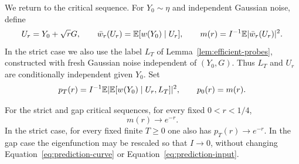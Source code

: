 We return to the critical sequence.  For $Y_0\sim\eta$ and independent
Gaussian noise, define
\[
 U_r=Y_0+\sqrt rG,\qquad
 \bar w_r(U_r)=\mathbb E[w(Y_0)\mid U_r],\qquad
 m(r)=I^{-1}\mathbb E|\bar w_r(U_r)|^2.
\]
In the strict case we also use the label $L_T$ of
Lemma~\ref{lem:efficient-probes}, constructed with fresh Gaussian noise
independent of $(Y_0,G)$. Thus $L_T$ and $U_r$ are conditionally
independent given $Y_0$. Set
\[
 p_T(r)=I^{-1}\mathbb E|\mathbb E[w(Y_0)\mid U_r,L_T]|^2,
 \qquad p_0(r)=m(r).
\]

\begin{proposition}
\label{prop:prediction}
For the strict and gap critical sequences, for every fixed
$0<r<1/4$,
\begin{equation}
 m(r)\longrightarrow e^{-r}.
 \label{eq:prediction-curve}
\end{equation}
In the strict case, for every fixed finite $T\ge0$ one also has
$p_T(r)\to e^{-r}$.  In the gap case the eigenfunction may be rescaled
so that $I\to0$, without changing Equation~\eqref{eq:prediction-curve}
or Equation~\eqref{eq:prediction-input}.
\end{proposition}

